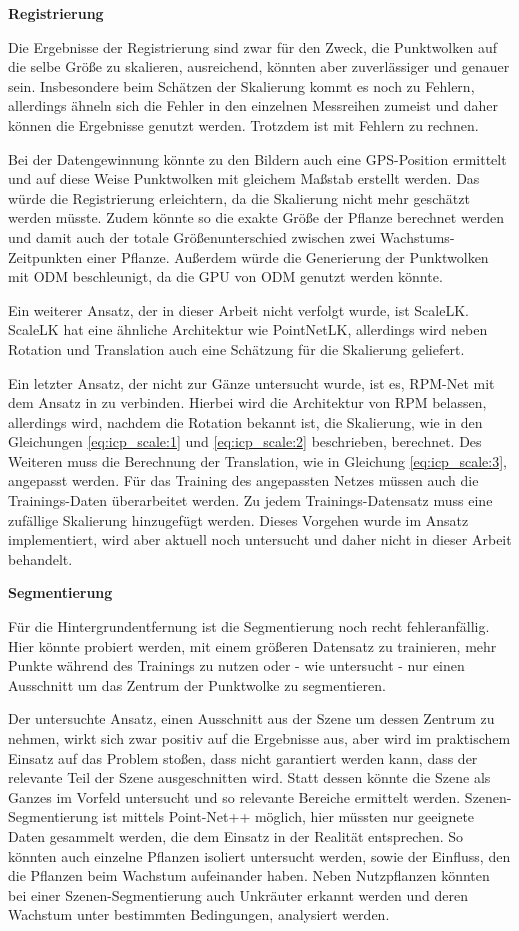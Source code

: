 \documentclass[12pt,titlepage, twoside]{article}
\begin{document}
\textbf{Registrierung}

Die Ergebnisse der Registrierung sind zwar für den Zweck, die Punktwolken auf die selbe Größe zu skalieren, ausreichend, könnten aber zuverlässiger und genauer sein. 
Insbesondere beim Schätzen der Skalierung kommt es noch zu Fehlern, allerdings ähneln sich die Fehler in den einzelnen Messreihen zumeist und daher können die Ergebnisse genutzt werden.
Trotzdem ist mit Fehlern zu rechnen.

Bei der Datengewinnung könnte zu den Bildern auch eine GPS-Position ermittelt und auf diese Weise Punktwolken mit gleichem Maßstab erstellt werden. 
Das würde die Registrierung erleichtern, da die Skalierung nicht mehr geschätzt werden müsste.
Zudem könnte so die exakte Größe der Pflanze berechnet werden und damit auch der totale Größenunterschied zwischen zwei Wachstums-Zeitpunkten einer Pflanze.
Außerdem würde die Generierung der Punktwolken mit ODM beschleunigt, da die GPU von ODM genutzt werden könnte.

Ein weiterer Ansatz, der in dieser Arbeit nicht verfolgt wurde, ist ScaleLK. 
ScaleLK hat eine ähnliche Architektur wie PointNetLK, allerdings wird neben Rotation und Translation auch eine Schätzung für die Skalierung geliefert.

Ein letzter Ansatz, der nicht zur Gänze untersucht wurde, ist es, RPM-Net mit dem Ansatz in \cite{Ziner2005PointSR} zu verbinden.
Hierbei wird die Architektur von RPM belassen, allerdings wird, nachdem die Rotation bekannt ist, die Skalierung, wie in den Gleichungen \ref{eq:icp_scale:1} und \ref{eq:icp_scale:2} beschrieben, berechnet.
Des Weiteren muss die Berechnung der Translation, wie in Gleichung \ref{eq:icp_scale:3}, angepasst werden. Für das Training des angepassten Netzes müssen auch die Trainings-Daten überarbeitet werden. 
Zu jedem Trainings-Datensatz muss eine zufällige Skalierung hinzugefügt werden. Dieses Vorgehen wurde im Ansatz implementiert, wird aber aktuell noch untersucht und daher nicht in dieser Arbeit behandelt.

\textbf{Segmentierung}

Für die Hintergrundentfernung ist die Segmentierung noch recht fehleranfällig. Hier könnte probiert werden, mit einem größeren Datensatz zu trainieren, 
mehr Punkte während des Trainings zu nutzen oder - wie untersucht - nur einen Ausschnitt um das Zentrum der Punktwolke zu segmentieren.

Der untersuchte Ansatz, einen Ausschnitt aus der Szene um dessen Zentrum zu nehmen, wirkt sich zwar positiv auf die Ergebnisse aus, aber wird im praktischem Einsatz auf das Problem stoßen, 
dass nicht garantiert werden kann, dass der relevante Teil der Szene ausgeschnitten wird.
Statt dessen könnte die Szene als Ganzes im Vorfeld untersucht und so relevante Bereiche ermittelt werden. 
Szenen-Segmentierung ist mittels Point-Net++ möglich, hier müssten nur geeignete Daten gesammelt werden, die dem Einsatz in der Realität entsprechen. 
So könnten auch einzelne Pflanzen isoliert untersucht werden, sowie der Einfluss, den die Pflanzen beim Wachstum aufeinander haben. 
Neben Nutzpflanzen könnten bei einer Szenen-Segmentierung auch Unkräuter erkannt werden und deren Wachstum unter bestimmten Bedingungen, analysiert werden.
\end{document}
